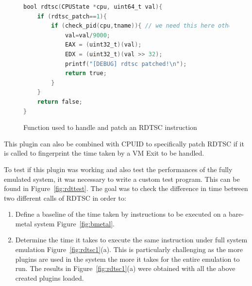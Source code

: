 \begin{figure}[htp]
\centering
\begin{lstlisting}[language=C]
bool rdtsc(CPUState *cpu, uint64_t val){
    if (rdtsc_patch==1){
        if (check_pid(cpu,tname)){ // we need this here otherwise it will segfault
            val=val/9000;
            EAX = (uint32_t)(val);
            EDX = (uint32_t)(val >> 32);
            printf("[DEBUG] rdtsc patched!\n");
            return true;
        }
    }
    return false;
}
\end{lstlisting}
\caption{Function used to handle and patch an RDTSC instruction}
\label{fig:rdtscpatch}
\end{figure}

This plugin can also be combined with CPUID to specifically patch RDTSC if it is called to fingerprint the time taken by a VM Exit to be handled. 

To test if this plugin was working and also test the performances of the fully emulated system, it was necessary to write a custom test program. This can be found in Figure~\ref{fig:rdttest}. The goal was to check the difference in time between two different calls of RDTSC in order to:

\begin{enumerate}
    \item Define a baseline of the time taken by instructions to be executed on a bare-metal system Figure~\ref{fig:bmetal}.
    \item Determine the time it takes to execute the same instruction under full system emulation Figure~\ref{fig:rdtsc1}(a). This is particularly challenging as the more plugins are used in the system the more it takes for the entire emulation to run. The results in Figure~\ref{fig:rdtsc1}(a) were obtained with all the above created plugins loaded. 
\end{enumerate}


